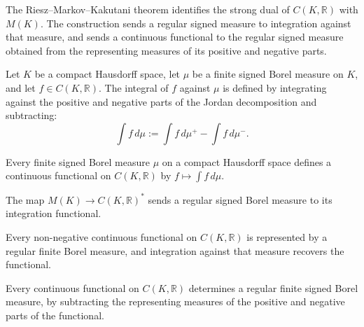 The Riesz--Markov--Kakutani theorem identifies the strong dual of
$C(K,\mathbb{R})$ with $M(K)$. The construction sends a regular
signed measure to integration against that measure, and sends a
continuous functional to the regular signed measure obtained from
the representing measures of its positive and negative parts.

\begin{definition}
\label{def:signedMeasureIntegral}
\leanok
{}
Let $K$ be a compact Hausdorff space, let $\mu$ be a finite signed
Borel measure on $K$, and let $f \in C(K,\mathbb{R})$. The integral
of $f$ against $\mu$ is defined by integrating against the positive
and negative parts of the Jordan decomposition and subtracting:
\[
  \int f\,d\mu :=
  \int f\,d\mu^{+} - \int f\,d\mu^{-}.
\]
\end{definition}

\begin{definition}
\label{def:signedMeasureFunctional}
\leanok
{}
Every finite signed Borel measure $\mu$ on a compact Hausdorff
space defines a continuous functional on $C(K,\mathbb{R})$ by
$f \mapsto \int f\,d\mu$.
\end{definition}

\begin{definition}
\label{def:mofK-toDual}
\leanok
{}
The map $M(K) \to C(K,\mathbb{R})^{*}$ sends a regular signed
Borel measure to its integration functional.
\end{definition}

\begin{definition}
\label{def:strongDual-measureOfNonneg}
\leanok
{}
Every non-negative continuous functional on $C(K,\mathbb{R})$ is
represented by a regular finite Borel measure, and integration
against that measure recovers the functional.
\end{definition}

\begin{definition}
\label{def:strongDual-toMofK}
\leanok
{}
Every continuous functional on $C(K,\mathbb{R})$ determines a
regular finite signed Borel measure, by subtracting the representing
measures of the positive and negative parts of the functional.
\end{definition}

